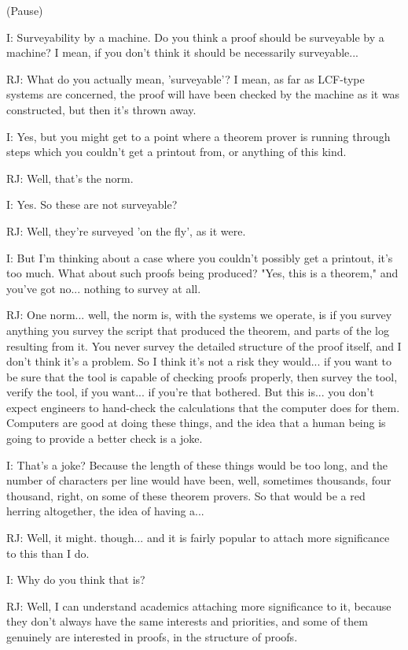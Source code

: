 \documentclass[10pt,titlepage]{book}
\begin{document}
(Pause)

I: Surveyability by a machine. Do you think a proof should be surveyable by a machine? I mean, if you don't think it should be necessarily surveyable...

RJ: What do you actually mean, 'surveyable'? I mean, as far as LCF-type systems are concerned, the proof will have been checked by the machine as it was constructed, but then it's thrown away.

I: Yes, but you might get to a point where a theorem prover is running through steps which you couldn't get a printout from, or anything of this kind.

RJ: Well, that's the norm.

I: Yes. So these are not surveyable?

RJ: Well, they're surveyed 'on the fly', as it were.

I: But I'm thinking about a case where you couldn't possibly get a printout, it's too much. What about such proofs being produced? "Yes, this is a theorem," and you've got no... nothing to survey at all.

RJ: One norm... well, the norm is, with the systems we operate, is if you survey anything you survey the script that produced the theorem, and parts of the log resulting from it. You never survey the detailed structure of the proof itself, and I don't think it's a problem. So I think it's not a risk they would... if you want to be sure that the tool is capable of checking proofs properly, then survey the tool, verify the tool, if you want... if you're that bothered. But this is... you don't expect engineers to hand-check the calculations that the computer does for them. Computers are good at doing these things, and the idea that a human being is going to provide a better check is a joke.

I: That's a joke? Because the length of these things would be too long, and the number of characters per line would have been, well, sometimes thousands,  four thousand, right, on some of these theorem provers. So that would be a red herring altogether, the idea of having a...

RJ: Well, it might.  though... and it is fairly popular to attach more significance to this than I do.

I: Why do you think that is?

RJ: Well, I can understand academics attaching more significance to it, because they don't always have the same interests and priorities, and some of them genuinely are interested in proofs, in the structure of proofs.
\end{document}
